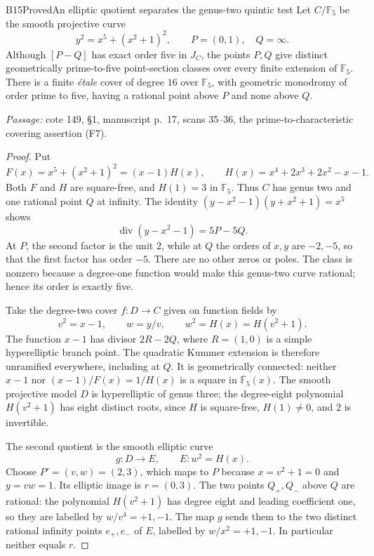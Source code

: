 \begin{result}{B15}{Proved}{An elliptic quotient separates the genus-two quintic test}
Let $C/\mathbb F_5$ be the smooth projective curve
\[
       y^2=x^5+(x^2+1)^2,
       \qquad P=(0,1),\quad Q=\infty.
\]
Although $[P-Q]$ has exact order five in $J_C$, the points $P,Q$
give distinct geometrically prime-to-five point-section classes
over every finite extension of $\mathbb F_5$. There is a finite
\emph{\'etale} cover of degree $16$ over $\mathbb F_5$, with geometric
monodromy of order prime to five, having a rational point above $P$
and none above $Q$.
\par\emph{Passage:} cote 149, \S1, manuscript p.~17, scans 35--36,
the prime-to-characteristic covering assertion (F7).
\end{result}

\begin{proof}
Put
\[
 F(x)=x^5+(x^2+1)^2=(x-1)H(x),\qquad
 H(x)=x^4+2x^3+2x^2-x-1.
\]
Both $F$ and $H$ are square-free, and $H(1)=3$ in $\mathbb F_5$.
Thus $C$ has genus two and one rational point $Q$ at infinity.
The identity
$(y-x^2-1)(y+x^2+1)=x^5$ shows
\[
              \operatorname{div}(y-x^2-1)=5P-5Q.
\]
At $P$, the second factor is the unit $2$, while at $Q$ the
orders of $x,y$ are $-2,-5$, so that the first factor has order
$-5$. There are no other zeros or poles. The class is nonzero
because a degree-one function would make this genus-two curve
rational; hence its order is exactly five.

Take the degree-two cover $f:D\to C$ given on function fields by
\[
        v^2=x-1,\qquad w=y/v,
        \qquad w^2=H(x)=H(v^2+1).
 \tag{B15.1}
\]
The function $x-1$ has divisor $2R-2Q$, where $R=(1,0)$ is a
simple hyperelliptic branch point. The quadratic Kummer extension
is therefore unramified everywhere, including at $Q$. It is
geometrically connected: neither $x-1$ nor
$(x-1)/F(x)=1/H(x)$ is a square in $\overline{\mathbb F}_5(x)$.
The smooth projective model $D$ is hyperelliptic of genus three;
the degree-eight polynomial $H(v^2+1)$ has eight distinct roots,
since $H$ is square-free, $H(1)\ne0$, and $2$ is invertible.

The second quotient is the smooth elliptic curve
\[
                  g:D\to E,\qquad E:w^2=H(x).
\]
Choose $P'=(v,w)=(2,3)$, which maps to $P$ because
$x=v^2+1=0$ and $y=vw=1$. Its elliptic image is $r=(0,3)$.
The two points $Q_+,Q_-$ above $Q$ are rational: the polynomial
$H(v^2+1)$ has degree eight and leading coefficient one, so they
are labelled by $w/v^4=+1,-1$. The map $g$ sends them to the
two distinct rational infinity points $e_+,e_-$ of $E$, labelled
by $w/x^2=+1,-1$. In particular neither equals $r$.


\end{proof}
